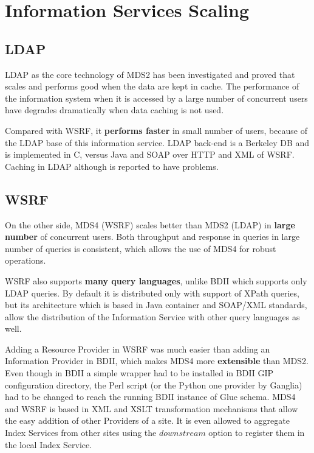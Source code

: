 \section{Information Services Scaling}

\subsection{LDAP}

LDAP as the core technology of MDS2 has been investigated \cite{zhang2004performance} and proved that scales and performs good when the data are kept in cache. The performance of the information system when it is accessed by a large number of concurrent users have degrades dramatically when data caching is not used.

Compared with WSRF, it {\bf performs faster} \cite{schopf2006monitoring} in small number of users, because of the LDAP base of this information service. LDAP back-end is a Berkeley DB and is implemented in C, versus Java and SOAP over HTTP and XML of WSRF. Caching in LDAP although is reported to have problems.

\subsection{WSRF}

On the other side, MDS4 (WSRF) scales better than MDS2 (LDAP) in {\bf large number} of concurrent users. Both throughput and response in queries in large number of queries is consistent, which allows the use of MDS4 for robust operations.

WSRF also supports {\bf many query languages}, unlike BDII which supports only LDAP queries. By default it is distributed only with support of XPath queries, but its architecture which is based in Java container and SOAP/XML standards, allow the distribution of the Information Service with other query languages as well.

Adding a Resource Provider in WSRF was much easier than adding an Information Provider in BDII, which makes MDS4 more {\bf extensible} than MDS2. Even though in BDII a simple wrapper had to be installed in BDII GIP configuration directory, the Perl script (or the Python one provider by Ganglia) had to be changed to reach the running BDII instance of Glue schema. MDS4 and WSRF is based in XML and XSLT transformation mechanisms that allow the easy addition of other Providers of a site. It is even allowed to aggregate Index Services from other sites using the $downstream$ option to register them in the local Index Service.

